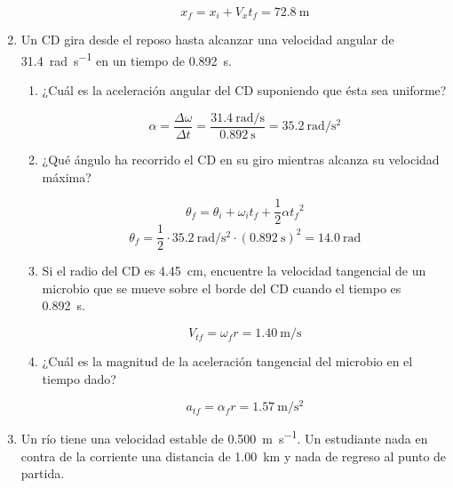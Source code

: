 \documentclass[../practica.root.tex]{subfiles}
\begin{document}
\begin{enumerate}
\begin{enumerate}
                \[x_f=x_i+V_xt_f=\boxed{\SI{72,8}{\meter}}\]
        \end{enumerate}

  \item Un CD gira desde el reposo hasta alcanzar una velocidad angular de \SI{31,4}{\radian\per\second} en un tiempo de \SI{0,892}{\second}.

        \begin{enumerate}
          \item ¿Cuál es la aceleración angular del CD suponiendo que ésta sea uniforme?

                \[\alpha=\frac{\Delta\omega}{\Delta t}=\frac{\SI{31,4}{\radian\per\second}}{\SI{0,892}{\second}}=\boxed{\SI{35,2}{\radian\per\second\squared}}\]

          \item ¿Qué ángulo ha recorrido el CD en su giro mientras alcanza su velocidad máxima?

                \[\theta_f=\theta_i+\omega_it_f+\frac{1}{2}\alpha{t_f}^2\]
                \[\theta_f=\frac{1}{2}\cdot\SI{35,2}{\radian\per\second\squared}\cdot(\SI{0,892}{\second})^2=\boxed{\SI{14,0}{\radian}}\]

          \item Si el radio del CD es \SI{4,45}{\cm}, encuentre la velocidad tangencial de un microbio que se mueve sobre el borde del CD cuando el tiempo es \SI{0,892}{\second}.

                \[V_{tf}=\omega_f r=\boxed{\SI{1,40}{\meter\per\second}}\]

          \item ¿Cuál es la magnitud de la aceleración tangencial del microbio en el tiempo dado?

                \[a_{tf}=\alpha_f r=\boxed{\SI{1,57}{\meter\per\second\squared}}\]
        \end{enumerate}

  \item Un río tiene una velocidad estable de \SI{0,500}{\meter\per\second}. Un estudiante nada en contra de la corriente una distancia de \SI{1,00}{\km} y nada de regreso al punto de partida.

        \begin{center}
        \end{center}


\end{enumerate}
\end{document}
